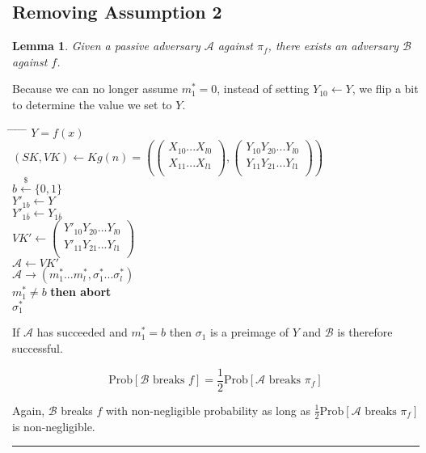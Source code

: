 \documentclass[twoside]{article}
\newtheorem{lemma}[theorem]{Lemma}
\newenvironment{proof}{{\bf Proof:}}{\hfill\rule{2mm}{2mm}}
\begin{document}
\subsection{Removing Assumption 2}

\begin{lemma}
Given a passive adversary $\mathcal{A}$ against $\pi_f$, there exists an adversary $\mathcal{B}$ against $f$.
\end{lemma}

\begin{proof}
Because we can no longer assume $m^*_1 = 0$, instead of setting $Y_{10} \leftarrow Y$, we flip a bit to determine the value we set to $Y$.

\begin{tabbing}
\hspace*{.25in} \= \hspace*{.25in} \= \hspace*{.25in} \= \hspace*{.25in} \= \hspace*{.25in} \=\kill
{} $Y = f(x)$\\
\>$(SK, VK) \leftarrow Kg(n) = \left(
\begin{pmatrix}
X_{10}...X_{l0}\\
X_{11}...X_{l1}\\
\end{pmatrix},
\begin{pmatrix}
Y_{10}Y_{20}...Y_{l0}\\
Y_{11}Y_{21}...Y_{l1}\\
\end{pmatrix}\right)$\\
\>$b \xleftarrow{\$} \{0,1\}$\\
\>$Y'_{1b} \leftarrow Y$\\
\>$Y'_{1\bar{b}} \leftarrow Y_{1\bar{b}}$\\
\>$VK' \leftarrow
\begin{pmatrix}
Y'_{10}Y_{20}...Y_{l0}\\
Y'_{11}Y_{21}...Y_{l1}\\
\end{pmatrix}$\\
\>$\mathcal{A} \leftarrow VK'$\\
\>$\mathcal{A} \rightarrow (m^*_1...m^*_l,\sigma^*_1...\sigma^*_l)$\\
 $m^*_1 \neq b$ {\bf then abort}\\
 $\sigma^*_1$
\end{tabbing}

If $\mathcal{A}$ has succeeded and $m^*_1 = b$ then $\sigma_1$ is a preimage of $Y$ and $\mathcal{B}$ is therefore successful.

$$\text{Prob}[\mathcal{B}\text{ breaks }f] = \frac{1}{2}\text{Prob}[\mathcal{A}\text{ breaks }\pi_f]$$

Again, $\mathcal{B}$ breaks $f$ with non-negligible probability as long as $\frac{1}{2}\text{Prob}[\mathcal{A}\text{ breaks }\pi_f]$ is non-negligible.
\end{proof}
\end{document}
